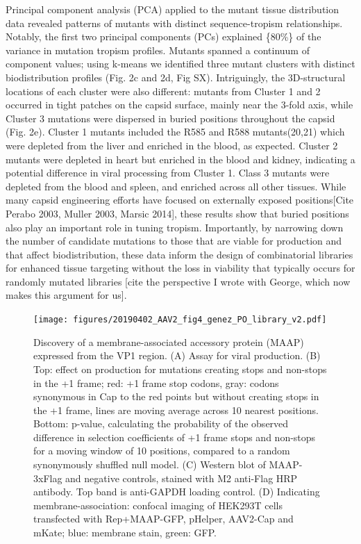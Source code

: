 Principal component analysis (PCA) applied to the mutant tissue distribution data revealed patterns of mutants with distinct sequence-tropism relationships. Notably, the first two principal components (PCs) explained  \{80\%\} of the variance in mutation tropism profiles. Mutants spanned a continuum of component values; using k-means we identified three mutant clusters with distinct biodistribution profiles (Fig. 2c and 2d, Fig SX). Intriguingly, the 3D-structural locations of each cluster were also different: mutants from Cluster 1 and 2 occurred in tight patches on the capsid surface, mainly near the 3-fold axis, while Cluster 3 mutations were dispersed in buried positions throughout the capsid (Fig. 2e). Cluster 1 mutants included the R585 and R588 mutants(20,21) which were depleted from the liver and enriched in the blood, as expected. Cluster 2 mutants were depleted in heart but enriched in the blood and kidney, indicating a potential difference in viral processing from Cluster 1. Class 3 mutants were depleted from the blood and spleen, and enriched across all other tissues. While many capsid engineering efforts have focused on externally exposed positions[Cite Perabo 2003, Muller 2003, Marsic 2014], these results show that buried positions also play an important role in tuning tropism. Importantly, by narrowing down the number of candidate mutations to those that are viable for production and that affect biodistribution, these data inform the design of combinatorial libraries for enhanced tissue targeting without the loss in viability that typically occurs for randomly mutated libraries [cite the perspective I wrote with George, which now makes this argument for us]. 

\begin{figure}
\texttt{[image: figures/20190402\_AAV2\_fig4\_genez\_PO\_library\_v2.pdf]}
\caption[Discovery of a membrane-associated accessory protein (MAAP) expressed from the VP1 region]{Discovery of a membrane-associated accessory protein (MAAP) expressed from the VP1 region. (A) Assay for viral production. (B) Top: effect on production for mutations creating stops and non-stops in the +1 frame; red: +1 frame stop codons, gray: codons synonymous in Cap to the red points but without creating stops in the +1 frame, lines are moving average across 10 nearest positions. Bottom: p-value, calculating the probability of the observed difference in selection coefficients of +1 frame stops and non-stops for a moving window of 10 positions, compared to a random synonymously shuffled null model. (C) Western blot of MAAP-3xFlag and negative controls, stained with M2 anti-Flag HRP antibody. Top band is anti-GAPDH loading control. (D) Indicating membrane-association: confocal imaging of HEK293T cells transfected with Rep+MAAP-GFP, pHelper, AAV2-Cap and mKate; blue: membrane stain, green: GFP. 
\label{fig:Figure 5}}
\end{figure}

